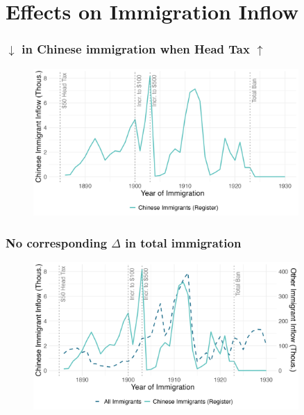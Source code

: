 \documentclass[xcolor=dvipsnames, compress, 12pt, aspectratio=169, handout]{beamer}
\begin{document}
\section{Effects on Immigration Inflow}
\begin{frame}
    \frametitle{$\downarrow$ in Chinese immigration when Head Tax $\uparrow$}
    \begin{figure}
        \includegraphics[width = 0.9\textwidth]{../../figs/slides/fig1_immflow_chionly.png}
    \end{figure}
\end{frame}

\begin{frame}
    \label{fig1_main}
    \frametitle{No corresponding $\Delta$ in total immigration \hyperlink{fig1_census}{}}
    \begin{figure}
        \includegraphics[width = 0.9\textwidth]{../../figs/slides/fig1_immflow.png}
    \end{figure}
\end{frame}
\end{document}

